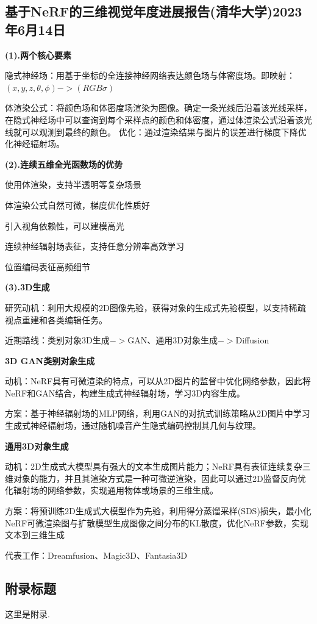 \documentclass[12pt, a4paper, oneside]{ctexart}
\begin{document}
    \subsection{基于NeRF的三维视觉年度进展报告(清华大学)\quad2023年6月14日}
    \noindent\textbf{(1).两个核心要素}

    隐式神经场：用基于坐标的全连接神经网络表达颜色场与体密度场。即映射：$(x,y,z,\theta,\phi)->(RGB\sigma)$

    体渲染公式：将颜色场和体密度场渲染为图像。确定一条光线后沿着该光线采样，在隐式神经场中可以查询到每个采样点的颜色和体密度，通过体渲染公式沿着该光线就可以观测到最终的颜色。
    优化：通过渲染结果与图片的误差进行梯度下降优化神经辐射场。

    \noindent\textbf{(2).连续五维全光函数场的优势}

    使用体渲染，支持半透明等复杂场景

    体渲染公式自然可微，梯度优化性质好

    引入视角依赖性，可以建模高光

    连续神经辐射场表征，支持任意分辨率高效学习

    位置编码表征高频细节

    \noindent\textbf{(3).3D生成}

    研究动机：利用大规模的2D图像先验，获得对象的生成式先验模型，以支持稀疏视点重建和各类编辑任务。

    近期路线：类别对象3D生成$->$GAN、通用3D对象生成$->$Diffusion

    \noindent\textbf{3D GAN类别对象生成}

    动机：NeRF具有可微渲染的特点，可以从2D图片的监督中优化网络参数，因此将NeRF和GAN结合，构建生成式神经辐射场，学习3D内容生成。

    方案：基于神经辐射场的MLP网络，利用GAN的对抗式训练策略从2D图片中学习生成式神经辐射场，通过随机噪音产生隐式编码控制其几何与纹理。

    \noindent\textbf{通用3D对象生成}

    动机：2D生成式大模型具有强大的文本生成图片能力；NeRF具有表征连续复杂三维对象的能力，并且其渲染方式是一种可微逆渲染，因此可以通过2D监督反向优化辐射场的网络参数，实现通用物体或场景的三维生成。

    方案：将预训练2D生成式大模型作为先验，利用得分蒸馏采样(SDS)损失，最小化NeRF可微渲染图与扩散模型生成图像之间分布的KL散度，优化NeRF参数，实现文本到三维生成

    代表工作：Dreamfusion、Magic3D、Fantasia3D


    \newpage
    
    

    \newpage

    \begin{appendices}
        \renewcommand{\thesection}{\Alph{section}}
        \section{附录标题}
        这里是附录.
    \end{appendices}
\end{document}
